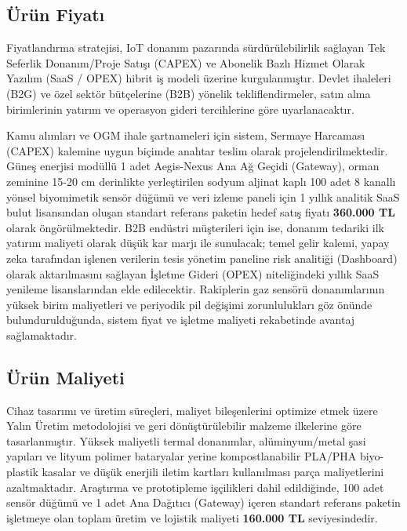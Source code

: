 \documentclass[11pt,a4paper]{article}
\begin{document}
\subsection{Ürün Fiyatı}

Fiyatlandırma stratejisi, IoT donanım pazarında sürdürülebilirlik sağlayan Tek Seferlik Donanım/Proje Satışı (CAPEX) ve Abonelik Bazlı Hizmet Olarak Yazılım (SaaS / OPEX) hibrit iş modeli üzerine kurgulanmıştır. Devlet ihaleleri (B2G) ve özel sektör bütçelerine (B2B) yönelik tekliflendirmeler, satın alma birimlerinin yatırım ve operasyon gideri tercihlerine göre uyarlanacaktır.

Kamu alımları ve OGM ihale şartnameleri için sistem, Sermaye Harcaması (CAPEX) kalemine uygun biçimde anahtar teslim olarak projelendirilmektedir. Güneş enerjisi modüllü 1 adet Aegis-Nexus Ana Ağ Geçidi (Gateway), orman zeminine 15-20 cm derinlikte yerleştirilen sodyum aljinat kaplı 100 adet 8 kanallı yönsel biyomimetik sensör düğümü ve veri izleme paneli için 1 yıllık analitik SaaS bulut lisansından oluşan standart referans paketin hedef satış fiyatı \textbf{360.000 TL} olarak öngörülmektedir. B2B endüstri müşterileri için ise, donanım tedariki ilk yatırım maliyeti olarak düşük kar marjı ile sunulacak; temel gelir kalemi, yapay zeka tarafından işlenen verilerin tesis yönetim paneline risk analitiği (Dashboard) olarak aktarılmasını sağlayan İşletme Gideri (OPEX) niteliğindeki yıllık SaaS yenileme lisanslarından elde edilecektir. Rakiplerin gaz sensörü donanımlarının yüksek birim maliyetleri ve periyodik pil değişimi zorunlulukları göz önünde bulundurulduğunda, sistem fiyat ve işletme maliyeti rekabetinde avantaj sağlamaktadır.

\subsection{Ürün Maliyeti}

Cihaz tasarımı ve üretim süreçleri, maliyet bileşenlerini optimize etmek üzere Yalın Üretim metodolojisi ve geri dönüştürülebilir malzeme ilkelerine göre tasarlanmıştır. Yüksek maliyetli termal donanımlar, alüminyum/metal şasi yapıları ve lityum polimer bataryalar yerine kompostlanabilir PLA/PHA biyo-plastik kasalar ve düşük enerjili iletim kartları kullanılması parça maliyetlerini azaltmaktadır. Araştırma ve prototipleme işçilikleri dahil edildiğinde, 100 adet sensör düğümü ve 1 adet Ana Dağıtıcı (Gateway) içeren standart referans paketin işletmeye olan toplam üretim ve lojistik maliyeti \textbf{160.000 TL} seviyesindedir.
\end{document}
